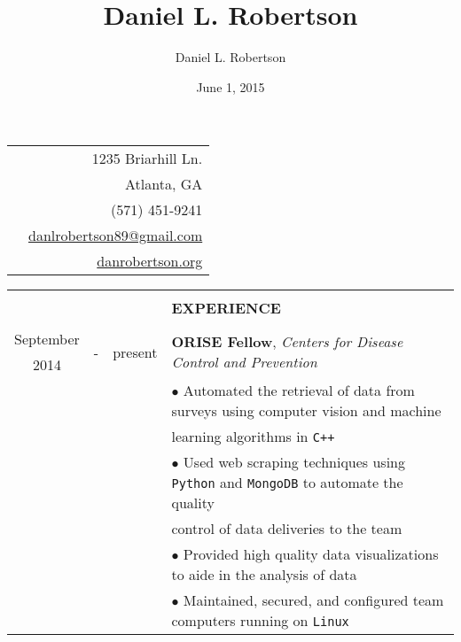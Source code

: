 \documentclass[10pt]{article}
\title{Daniel L. Robertson}
\date{June 1, 2015}
\author{Daniel L. Robertson}
\begin{document}
    \normalfont
    \begin{table}[ht]
        \begin{tabular}{p{13cm}r}
            \multirow{5}{*}{\hspace*{1cm}\color{maroon}{\huge\textbf{Daniel L. Robertson}}} & 1235 Briarhill Ln.\\
            & Atlanta, GA\\
            & (571) 451-9241\\
            & \href{mailto:danlrobertson89@gmail.com}{danlrobertson89@gmail.com}\\
            & \href{http://danrobertson.org}{danrobertson.org}\\
        \end{tabular}
        \begin{tabular}{@{\hspace{0mm}}c@{\hspace{1mm}}c@{\hspace{3mm}}cl}
            & & & \color{maroon}{\rule{14cm}{0.75pt}}\\
            & & & \large{\textbf{EXPERIENCE}}\\
            & & & \color{maroon}{\rule{14cm}{0.75pt}}\\
            September & \multirow{2}{*}{-} & \multirow{2}{*}{present} & \multirow{2}{*}{\textbf{ORISE Fellow}, \textit{Centers for Disease Control and Prevention}}\\
            2014 & & &\\
            & & & $\bullet$ Automated the retrieval of data from surveys using computer vision and machine\\
            & & & \hspace*{4mm}learning algorithms in \texttt{C++}\\
            & & & $\bullet$ Used web scraping techniques using \texttt{Python} and \texttt{MongoDB} to automate the quality\\
            & & & \hspace*{4mm}control of data deliveries to the team\\
            & & & $\bullet$ Provided high quality data visualizations to aide in the analysis of data\\
            & & & $\bullet$ Maintained, secured, and configured team computers running on \texttt{Linux}\\

\end{tabular}
\end{table}
\end{document}
